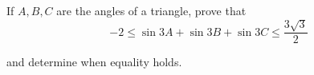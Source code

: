 If $A,B,C$ are the angles of a triangle, prove that\[-2 \le \sin{3A}+\sin{3B}+\sin{3C} \le \frac{3\sqrt{3}}{2}\]

and determine when equality holds.